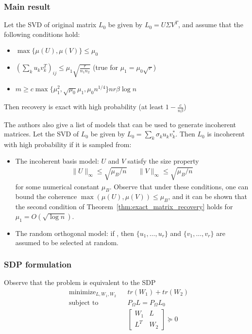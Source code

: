 \documentclass{../common/projectreport}
\begin{document}
\subsubsection{Main result}
\begin{theorem}
\label{thm:exact_matrix_recovery}
Let the SVD of original matrix $L_0$ be given by $L_0 = U \Sigma V^T$, and assume that the following conditions hold:
\begin{itemize}
\item $\max \{\mu(U), \mu(V)\} \leq \mu_0$
\item $\left( \sum_k u_kv_k^T\right)_{ij} \leq \mu_1 \sqrt{\frac{r}{n_1 n_2}}$ (true for $\mu_1 = \mu_0\sqrt{r}$)
\item $m \geq c \max \{ \mu_1^2, \sqrt{\mu_0}\mu_1, \mu_0 n^{1/4}\}n r \beta \log n$
\end{itemize}
Then recovery is exact with high probability (at least $1-\frac{c}{n\beta}$)
\end{theorem}


The authors also give a list of models that can be used to generate incoherent matrices. Let the SVD of $L_0$ be given by $L_0 = \sum_k \sigma_k u_k v_k^*$. Then $L_0$ is incoherent with high probability if it is sampled from:
\begin{itemize}
\item The incoherent basis model: $U$ and $V$ satisfy the size property
\[
\begin{aligned}
\|U\|_\infty \leq \sqrt{\mu_B/n} && \|V\|_\infty \leq \sqrt{\mu_B/n}
\end{aligned}
\]
for some numerical constant $\mu_B$. Observe that under these conditions, one can bound the coherence $\max (\mu(U), \mu(V)) \leq \mu_B$, and it can be shown that the second condition of Theorem~\ref{thm:exact_matrix_recovery} holds for $\mu_1 = O(\sqrt{\log n})$.

\item The random orthogonal model: if , then $\{u_1, \dots, u_r\}$ and $\{v_1, \dots, v_r\}$ are assumed to be selected at random.
\end{itemize}

\subsubsection{SDP formulation}

Observe that the problem is equivalent to the SDP
\begin{equation}
\begin{aligned}
&\text{minimize}_{L, W_1, W_2} && tr(W_1) + tr(W_2) \\
&\text{subject to} && P_\Omega L = P_\Omega L_0\\
&&& \left[ \begin{array}{cc}
W_1 & L \\
L^T & W_2
\end{array} \right] \succeq 0
\end{aligned}
\end{equation}
\end{document}
